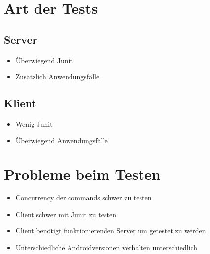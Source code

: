 \documentclass[parskip=full,11pt]{scrartcl}
\begin{document}
\section{Art der Tests}
	\subsection{Server}
		\begin{itemize}
			\item Überwiegend Junit %
			\item Zusätzlich Anwendungsfälle
		\end{itemize}

	\subsection{Klient}
		\begin{itemize}
			\item Wenig Junit %
			\item Überwiegend Anwendungsfälle
		\end{itemize}

\section{Probleme beim Testen}
	\begin{itemize}
		\item Concurrency der commands schwer zu testen
		\item Client schwer mit Junit zu testen
		\item Client benötigt funktionierenden Server um getestet zu werden
		\item Unterschiedliche Androidversionen verhalten unterschiedlich
	\end{itemize}
\end{document}
